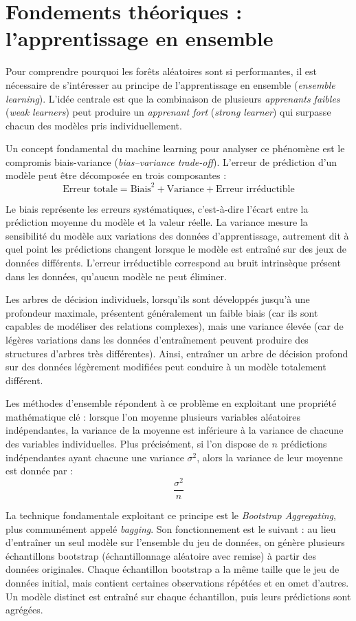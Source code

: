 \section{Fondements théoriques : l’apprentissage en ensemble}

Pour comprendre pourquoi les forêts aléatoires sont si performantes, il est nécessaire de s’intéresser au principe de l’apprentissage en ensemble (\emph{ensemble learning}). L’idée centrale est que la combinaison de plusieurs \emph{apprenants faibles} (\emph{weak learners}) peut produire un \emph{apprenant fort} (\emph{strong learner}) qui surpasse chacun des modèles pris individuellement.

Un concept fondamental du machine learning pour analyser ce phénomène est le compromis biais-variance (\emph{bias--variance trade-off}). L’erreur de prédiction d’un modèle peut être décomposée en trois composantes :
\[
\text{Erreur totale} = \text{Biais}^2 + \text{Variance} + \text{Erreur irréductible}
\]

Le biais représente les erreurs systématiques, c’est-à-dire l’écart entre la prédiction moyenne du modèle et la valeur réelle. La variance mesure la sensibilité du modèle aux variations des données d’apprentissage, autrement dit à quel point les prédictions changent lorsque le modèle est entraîné sur des jeux de données différents. L’erreur irréductible correspond au bruit intrinsèque présent dans les données, qu’aucun modèle ne peut éliminer.

Les arbres de décision individuels, lorsqu’ils sont développés jusqu’à une profondeur maximale, présentent généralement un faible biais (car ils sont capables de modéliser des relations complexes), mais une variance élevée (car de légères variations dans les données d’entraînement peuvent produire des structures d’arbres très différentes). Ainsi, entraîner un arbre de décision profond sur des données légèrement modifiées peut conduire à un modèle totalement différent.

Les méthodes d’ensemble répondent à ce problème en exploitant une propriété mathématique clé : lorsque l’on moyenne plusieurs variables aléatoires indépendantes, la variance de la moyenne est inférieure à la variance de chacune des variables individuelles. Plus précisément, si l’on dispose de $n$ prédictions indépendantes ayant chacune une variance $\sigma^2$, alors la variance de leur moyenne est donnée par :
\[
\frac{\sigma^2}{n}
\]

La technique fondamentale exploitant ce principe est le \emph{Bootstrap Aggregating}, plus communément appelé \emph{bagging}. Son fonctionnement est le suivant : au lieu d’entraîner un seul modèle sur l’ensemble du jeu de données, on génère plusieurs échantillons bootstrap (échantillonnage aléatoire avec remise) à partir des données originales. Chaque échantillon bootstrap a la même taille que le jeu de données initial, mais contient certaines observations répétées et en omet d’autres. Un modèle distinct est entraîné sur chaque échantillon, puis leurs prédictions sont agrégées.


